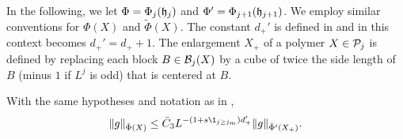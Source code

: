 In the following, we let $\Phi = \Phi_j(\mathfrak{h}_j)$ and $\Phi' = \Phi_{j+1}(\mathfrak{h}_{j+1})$.
We employ similar conventions for $\Phi(X)$ and $\tilde\Phi(X)$. The constant $d_+'$
is defined in \cite[\eqref{loc-e:dplusprimedef}]{BS-rg-loc} and in this context becomes
$d_+' = d_+ + 1$. The enlargement $X_+$ of a polymer $X\in\mathcal{P}_j$ is defined by replacing
each block $B\in\mathcal{B}_j(X)$ by a cube of twice the side length of $B$ (minus $1$ if $L^j$
is odd) that is centered at $B$.

\begin{lemma}
\label{lem:phiij-improved}
With the same hypotheses and notation as in \cite[Lemma~\ref{loc-lem:phij}]{BS-rg-loc},
\begin{equation}
\lbeq{gbd-improved}
\|g\|_{\tilde{\Phi} (X)}
\leq
\bar C_3
L^{- (1 + s \1_{j \geq j_m}) d_+'}  \|g\|_{\tilde{\Phi}' (X_+)}.
\end{equation}
\end{lemma}


